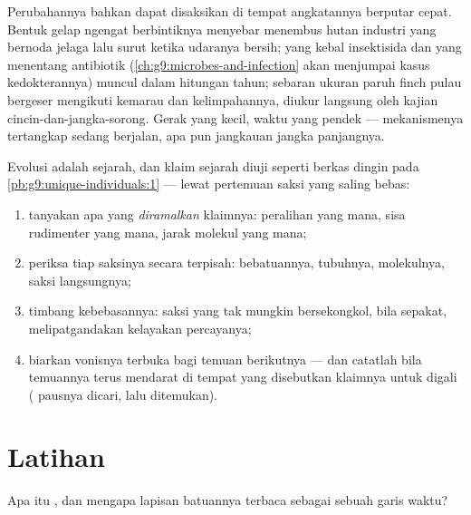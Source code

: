 \begin{example}\label{ex:g9:evidence-of-evolution:live}
Perubahannya bahkan dapat disaksikan di tempat angkatannya
berputar cepat. Bentuk gelap ngengat berbintiknya menyebar
menembus hutan industri yang bernoda jelaga lalu surut ketika
udaranya bersih;  yang kebal insektisida dan 
yang menentang antibiotik
(\cref{ch:g9:microbes-and-infection} akan menjumpai kasus
kedokterannya) muncul dalam hitungan tahun; sebaran ukuran
paruh  finch pulau bergeser mengikuti kemarau dan
kelimpahannya, diukur langsung oleh kajian
cincin-dan-jangka-sorong. Gerak yang kecil, waktu yang
pendek --- mekanismenya tertangkap sedang berjalan, apa pun
jangkauan jangka panjangnya.
\end{example}

\begin{method}\label{met:g9:evidence-of-evolution:weigh}
Evolusi adalah sejarah, dan klaim sejarah diuji seperti
berkas dingin pada \cref{pb:g9:unique-individuals:1} ---
lewat pertemuan saksi yang saling bebas:
\begin{enumerate}
  \item tanyakan apa yang \emph{diramalkan} klaimnya:
        peralihan yang mana, sisa rudimenter yang mana, jarak
        molekul yang mana;
  \item periksa tiap saksinya secara terpisah: bebatuannya,
        tubuhnya, molekulnya, saksi langsungnya;
  \item timbang kebebasannya: saksi yang tak mungkin
        bersekongkol, bila sepakat, melipatgandakan kelayakan
        percayanya;
  \item biarkan vonisnya terbuka bagi temuan berikutnya ---
        dan catatlah bila temuannya terus mendarat di tempat
        yang disebutkan klaimnya untuk digali (
        pausnya dicari, lalu ditemukan).
\end{enumerate}
\end{method}

\section{Latihan}

\begin{exercise}[$\star$]\label{exo:g9:evidence-of-evolution:1}
Apa itu , dan mengapa lapisan batuannya terbaca sebagai
sebuah garis waktu?
\end{exercise}

